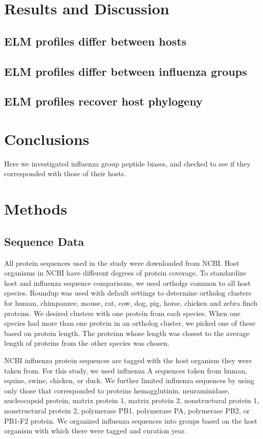 \documentclass[10pt]{bmc_article}
\newenvironment{bmcformat}{\begin{raggedright}\baselineskip20pt\sloppy\setboolean{publ}{false}}{\end{raggedright}\baselineskip20pt\sloppy}
\begin{document}
\begin{bmcformat}
\section*{Results and Discussion}
  \subsection*{ELM profiles differ between hosts}

  \subsection*{ELM profiles differ between influenza groups}

  \subsection*{ELM profiles recover host phylogeny}

\section*{Conclusions}
Here we investigated influenza group peptide biases, and checked to
see if they corresponded with those of their hosts.
  
\section*{Methods}

\subsection*{Sequence Data}
All protein sequences used in the study were downloaded from
NCBI. Host organisms in NCBI have different degrees of protein
coverage. To standardize host and influenza sequence comparisons, we
used ortholgs common to all host species. Roundup
\cite{deluca2006roundup} was used with default settings to determine
ortholog clusters for human, chimpanzee, mouse, rat, cow, dog, pig,
horse, chicken and zebra finch proteins. We desired clusters with one
protein from each species. When one species had more than one protein
in an ortholog cluster, we picked one of these based on protein
length. The proteinn whose length was closest to the average length of
proteins from the other species was chosen.

NCBI influenza protein sequences are tagged with the host organism
they were taken from. For this study, we used influenza A sequences
taken from human, equine, swine, chicken, or duck. We further limited
influenza sequences by using only those that corresponded to proteins
hemagglutinin, neuraminidase, nucleocapsid protein, matrix protein 1,
matrix protein 2, nonstructural protein 1, nonstructural protein 2,
polymerase PB1, polymerase PA, polymerase PB2, or PB1-F2 protein. We
organized influenza sequences into groups based on the host organism
with which there were tagged and curation year.


\end{bmcformat}
\end{document}
